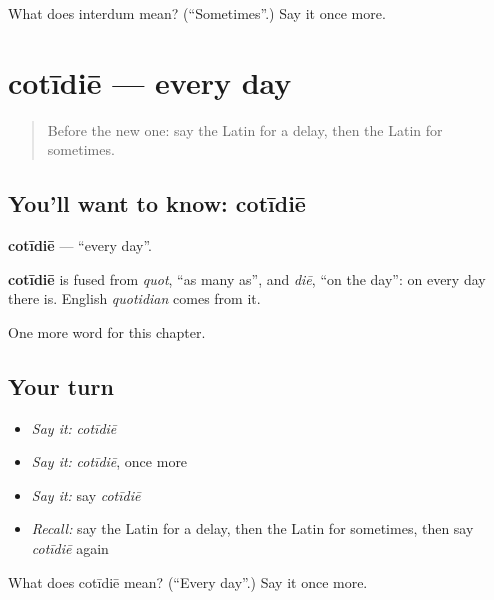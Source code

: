 \begin{tcolorbox}[breakable,colback=teal!4,colframe=teal!35!black,title={Before you move on}]
What does interdum mean? (\textquotedblleft{}Sometimes\textquotedblright{}.) Say it once more.
\end{tcolorbox}
\section[cotīdiē]{cotīdiē — every day}

\label{lesson:LA-C237-cotidie}



\begin{quote}
Before the new one: say the Latin for a delay, then the Latin for sometimes.
\end{quote}

\subsection*{You'll want to know: cotīdiē}
\textbf{cotīdiē} — \textquotedblleft{}every day\textquotedblright{}.

\begin{cousinweb}
\textbf{cotīdiē} is fused from \emph{quot}, \textquotedblleft{}as many as\textquotedblright{}, and \emph{diē}, \textquotedblleft{}on the day\textquotedblright{}: on every day there is. English \emph{quotidian} comes from it.
\end{cousinweb}

\begin{grammarlens}[title={What you've built}]
One more word for this chapter.
\end{grammarlens}

\subsection*{Your turn}
\begin{itemize}
\raggedright
  \item \emph{Say it:} \emph{cotīdiē}
  \item \emph{Say it:} \emph{cotīdiē}, once more
  \item \emph{Say it:} say \emph{cotīdiē}
  \item \emph{Recall:} say the Latin for a delay, then the Latin for sometimes, then say \emph{cotīdiē} again
\end{itemize}

\begin{tcolorbox}[breakable,colback=teal!4,colframe=teal!35!black,title={Before you move on}]
What does cotīdiē mean? (\textquotedblleft{}Every day\textquotedblright{}.) Say it once more.
\end{tcolorbox}
